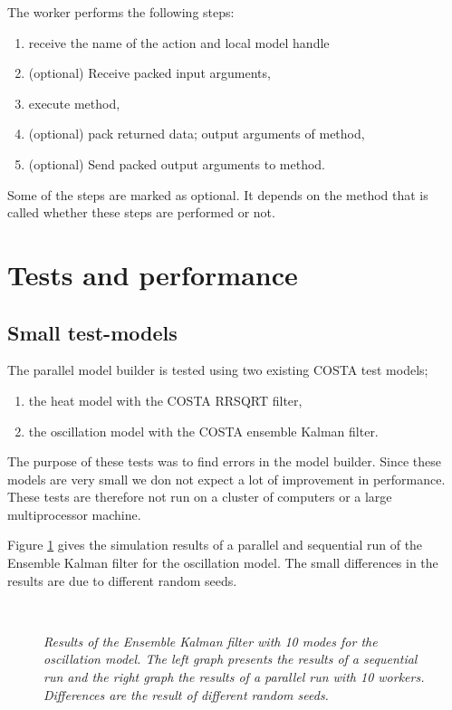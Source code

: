The worker performs the following steps:
\begin{enumerate}
\item receive the name of the action and local model handle
\item (optional) Receive packed input arguments,
\item execute method,
\item (optional) pack returned data; output arguments of method,
\item (optional) Send packed output arguments to method.
\end{enumerate}

Some of the steps are marked as optional. It depends on the method that is
called whether these steps are performed or not.



\section{Tests and performance}\label{Sec:Tests and Performance}
\subsection{Small test-models}
The parallel model builder is tested using two existing COSTA test models; 
\begin{enumerate}
\item the heat model with the COSTA RRSQRT filter,
\item the oscillation model with the COSTA ensemble Kalman filter.
\end{enumerate}

The purpose of these tests was to find errors in the model builder. Since
these models are very small we don not expect a lot of improvement in
performance. These tests are therefore not run on a cluster of computers or
a large multiprocessor machine.

Figure \ref{Fig:twee} gives the simulation results of a parallel and
sequential run of the Ensemble Kalman filter for the oscillation model. The
small differences in the results are due to different random seeds.

\begin{figure}
\hbox{
      }

\caption{\em Results of the Ensemble Kalman filter with 10 modes for the
             oscillation model. The left graph presents the results of a
             sequential run and the right graph the results of a parallel
             run with 10 workers. Differences are the result of different
             random seeds.}
\label{Fig:twee}
\end{figure}

